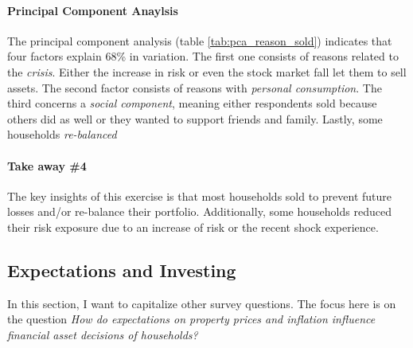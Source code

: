 \documentclass[ProjectABM]{subfiles}
\begin{document}
\paragraph{Principal Component Anaylsis}
The principal component analysis (table \ref{tab:pca_reason_sold}) indicates that four factors explain 68\% in variation. The first one consists of reasons related to the \textit{crisis}. Either the increase in risk or even the stock market fall let them to sell assets. The second factor consists of reasons with \textit{personal consumption}. The third concerns a \textit{social component}, meaning either respondents sold because others did as well or they wanted to support friends and family. Lastly, some households \textit{re-balanced}



\paragraph{Take away \#4}
The key insights of this exercise is that most households sold to prevent future losses and/or re-balance their portfolio. Additionally, some households reduced their risk exposure due to an increase of risk or the recent shock experience.

\subsection{Expectations and Investing} \label{sec:results_exp}
In this section, I want to capitalize other survey questions. The focus here is on the question \textit{How do expectations on property prices and inflation influence financial asset decisions of households?} %

\end{document}
